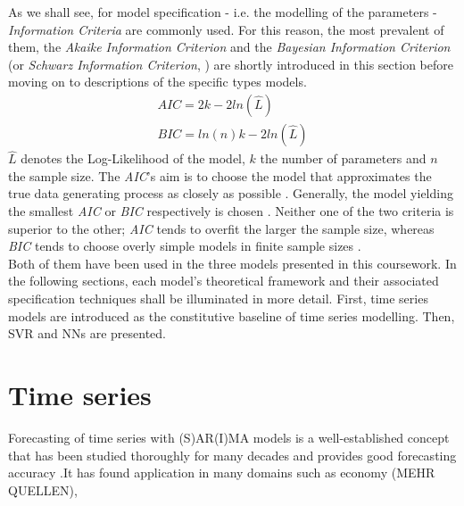 \documentclass[a4paper, 11pt]{article}
\begin{document}
As we shall see, for model specification - i.e. the modelling of the parameters - \textit{Information Criteria} are commonly used. For this reason, the most prevalent of them, the \textit{Akaike Information Criterion} \cite{Akaike.1974} and the \textit{Bayesian Information Criterion} (or \textit{Schwarz Information Criterion}, \cite{Schwarz.1978}) are shortly introduced in this section before moving on to descriptions of the specific types models.
\begin{align}
AIC = 2k - 2ln(\hat{L})\\
BIC = ln(n)k - 2ln(\hat{L})
\end{align}
$\hat{L}$ denotes the Log-Likelihood of the model, $k$ the number of parameters and $n$ the sample size. The \textit{AIC}'s aim is to choose the model that approximates the true data generating process as closely as possible \cite{Wit.2012}. Generally, the model yielding the smallest \textit{AIC} or \textit{BIC} respectively is chosen \cite{Hastie.2017}.
Neither one of the two criteria is superior to the other; \textit{AIC} tends to overfit the larger the sample size, whereas \textit{BIC} tends to choose overly simple models in finite sample sizes \citep{Hastie.2017}.\\
Both of them have been used in the three models presented in this coursework.
In the following sections, each model's theoretical framework and their associated specification techniques shall be illuminated in more detail. First, time series models are introduced as the constitutive baseline of time series modelling. Then, SVR and NNs are presented.

\section{Time series}
Forecasting of time series with (S)AR(I)MA models is a well-established concept that has been studied thoroughly for many decades and provides good forecasting accuracy \citep{Arlt.2017, Khandelwal.2015}.It has found application in many domains such as economy (MEHR QUELLEN), 
\end{document}

